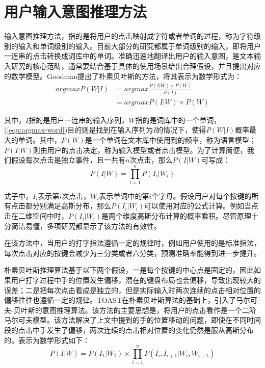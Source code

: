 \section{用户输入意图推理方法} %
输入意图推理方法，指的是将用户的点击映射成字符或者单词的过程，称为字符级别的输入和单词级别的输入。目前大部分的研究都属于单词级别的输入，即将用户一连串的点击转换成词库中的单词。准确迅速地翻译出用户的输入意图，是文本输入研究的核心范畴，通常要结合基于具体的使用场景给出合理假设，并且提出对应的数学模型。Goodman\cite{language2002goodman}提出了朴素贝叶斯的方法，将其表示为数学形式为：
\begin{equation}
    \label{equ:argmax-word}
    \begin{aligned}
    argmax P(W|I) &= argmax \frac{P(I|W) \times P(W)}{P(I)} \\
                  &= argmax P(I|W) \times P(W)
    \end{aligned}
\end{equation}

其中，$I$指的是用户一连串的输入序列，$W$指的是词库中的一个单词，(\ref{equ:argmax-word})目的则是找到在输入序列为$I$的情况下，使得$P(W|I)$概率最大的单词。其中，$P(W)$是一个单词在文本库中使用到的频率，称为语言模型；$P(I|W)$则由用户的点击决定，称为输入模型或者点击模型。为了计算简便，我们假设每次点击是独立事件，且一共有$n$次点击，那么$P(I|W)$可写成：
\begin{equation}
    P(I|W) = \prod_{i=1}^{n}P(I_i|W_i)
\end{equation}

式子中，$I_i$表示第$i$次点击，$W_i$表示单词中的第$i$个字母。假设用户对每个按键的所有点击都分别满足高斯分布，那么$P(I_i|W_i)$可以使用对应的公式计算。例如当点击在二维空间中时，$P(I_i|W_i)$是两个维度高斯分布计算的概率乘积。尽管原理十分简洁易懂，多项研究\cite{2017blindtype}\cite{2015atk}\cite{2018forceboard}都显示了该方法的有效性。

在该方法中，当用户的打字指法遵循一定的规律时，例如用户使用的是标准指法\cite{2015atk}，每次点击对应的按键会减少为三分类或者六分类，预测准确率能得到进一步提升。

朴素贝叶斯推理算法基于以下两个假设，一是每个按键的中心点是固定的，因此如果用户打字过程中手的位置发生偏移，潜在的键盘布局也会偏移，导致出现较大的误差；二是把每次点击看成是独立的，但是实际输入时两次连续的点击相对位置的偏移往往也遵循一定的规律\cite{2018shitoast}。TOAST\cite{2018shitoast}在朴素贝叶斯算法的基础上，引入了马尔可夫-贝叶斯的意图推理算法。该方法的主要思想是，将用户的点击看作是一个二阶马尔可夫模型。该方法解决了上文中提到的手的位置移动的问题，即使在不同时间段的点击中手发生了偏移，两次连续的点击相对位置的变化仍然是服从高斯分布的。表示为数学形式如下：
\begin{equation}
    \label{equ:markov-bayesian}
    P(I|W) = P(I_1|W_1) \times \prod_{i=1}^{n}P(I_i, I_{i+1}|W_i, W_{i+1})
\end{equation}

